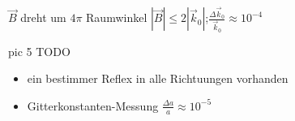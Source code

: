 \begin{itemize}
\(\vec B\) dreht um \(4\pi\) Raumwinkel \(|\vec B| \leq 2|\vec k_0|\);\(\frac{\Delta \vec k_0}{ \vec k_0}\approx 10^{-4}\)

pic 5 TODO

\begin{itemize}
\item ein bestimmer Reflex in alle Richtuungen vorhanden
\item Gitterkonstanten-Messung \(\frac {\Delta a}{a}\approx 10^{-5}\)
\end{itemize}

\end{itemize}





